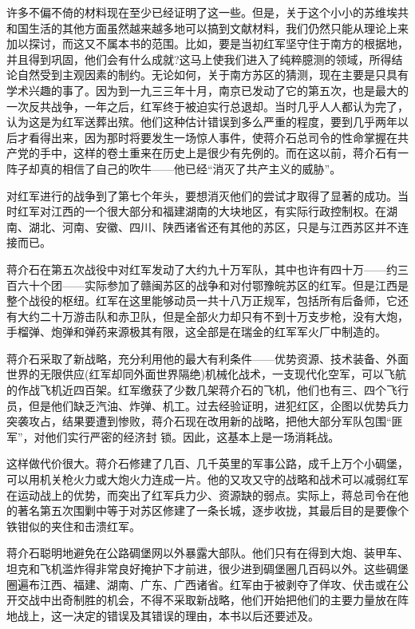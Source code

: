 \documentclass[10pt]{book}
\begin{document}
许多不偏不倚的材料现在至少已经证明了这一些。但是，关于这个小小的苏维埃共和国生活的其他方面虽然越来越多地可以搞到文献材料，我们仍然只能从理论上来加以探讨，而这又不属本书的范围。比如，要是当初红军坚守住于南方的根据地，并且得到巩固，他们会有什么成就?这马上使我们进入了纯粹臆测的领域，所得结论自然受到主观因素的制约。无论如何，关于南方苏区的猜测，现在主要是只具有学术兴趣的事了。因为到一九三三年十月，南京已发动了它的第五次，也是最大的一次反共战争，一年之后，红军终于被迫实行总退却。当时几乎人人都认为完了，认为这是为红军送葬出殡。他们这种估计错误到多么严重的程度，要到几乎两年以后才看得出来，因为那时将要发生一场惊人事件，使蒋介石总司令的性命掌握在共产党的手中，这样的卷土重来在历史上是很少有先例的。而在这以前，蒋介石有一阵子却真的相信了自己的吹牛——他已经“消灭了共产主义的威胁”。

对红军进行的战争到了第七个年头，要想消灭他们的尝试才取得了显著的成功。当时红军对江西的一个很大部分和福建湖南的大块地区，有实际行政控制权。在湖南、湖北、河南、安徽、四川、陕西诸省还有其他的苏区，只是与江西苏区并不连接而已。

蒋介石在第五次战役中对红军发动了大约九十万军队，其中也许有四十万——约三百六十个团——实际参加了赣闽苏区的战争和对付鄂豫皖苏区的红军。但是江西是整个战役的枢纽。红军在这里能够动员一共十八万正规军，包括所有后备师，它还有大约二十万游击队和赤卫队，但是全部火力却只有不到十万支步枪，没有大炮，手榴弹、炮弹和弹药来源极其有限，这全部是在瑞金的红军军火厂中制造的。

蒋介石采取了新战略，充分利用他的最大有利条件——优势资源、技术装备、外面世界的无限供应(红军却同外面世界隔绝)机械化战术，一支现代化空军，可以飞航的作战飞机近四百架。红军缴获了少数几架蒋介石的飞机，他们也有三、四个飞行员，但是他们缺乏汽油、炸弹、机工。过去经验证明，进犯红区，企图以优势兵力突袭攻占，结果要遭到惨败，蒋介石现在改用新的战略，把他大部分军队包围“匪军”，对他们实行严密的经济封 锁。因此，这基本上是一场消耗战。

这样做代价很大。蒋介石修建了几百、几千英里的军事公路，成千上万个小碉堡，可以用机关枪火力或大炮火力连成一片。他的又攻又守的战略和战术可以减弱红军在运动战上的优势，而突出了红军兵力少、资源缺的弱点。实际上，蒋总司令在他的著名第五次围剿中等于对苏区修建了一条长城，逐步收拢，其最后目的是要像个铁钳似的夹住和击溃红军。

蒋介石聪明地避免在公路碉堡网以外暴露大部队。他们只有在得到大炮、装甲车、坦克和飞机滥炸得非常良好掩护下才前进，很少进到碉堡圈几百码以外。这些碉堡圈遍布江西、福建、湖南、广东、广西诸省。红军由于被剥夺了佯攻、伏击或在公开交战中出奇制胜的机会，不得不采取新战略，他们开始把他们的主要力量放在阵地战上，这一决定的错误及其错误的理由，本书以后还要述及。
\end{document}
